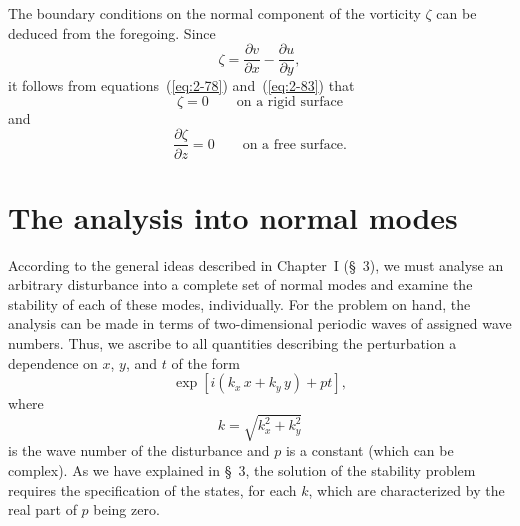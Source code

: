 The boundary conditions on the normal component of the vorticity $\zeta$
can be deduced from the foregoing. Since
\begin{equation}
\label{eq:2-85}
\zeta = \frac{\partial v}{\partial x} - \frac{\partial u}{\partial y},
\end{equation}
it follows from equations~(\ref{eq:2-78}) and~(\ref{eq:2-83}) that
\begin{equation}
\label{eq:2-86}
\zeta = 0 \qquad\text{on a rigid surface}
\end{equation}
and
\begin{equation}
\label{eq:2-87}
\frac{\partial\zeta}{\partial z} = 0 \qquad\text{on a free surface.}
\end{equation}

\section{The analysis into normal modes}\label{sec:10}

According to the general ideas described in Chapter~I (\S~3), we must
analyse an arbitrary disturbance into a complete set of normal modes
and examine the stability of each of these modes, individually. For the
problem on hand, the analysis can be made in terms of two-dimensional
periodic waves of assigned wave numbers. Thus, we ascribe to all
quantities describing the perturbation a dependence on $x$, $y$, and $t$ of
the form
\begin{equation}
\label{eq:2-88}
\exp[i(k_x\,x + k_y\,y) + pt],
\end{equation}
where
\begin{equation}
\label{eq:2-89}
k = \sqrt{k_x^2 + k_y^2}
\end{equation}
is the wave number of the disturbance and $p$ is a constant (which can be
complex). As we have explained in \S~3, the solution of the stability
problem requires the specification of the states, for each $k$, which are
characterized by the real part of $p$ being zero.

